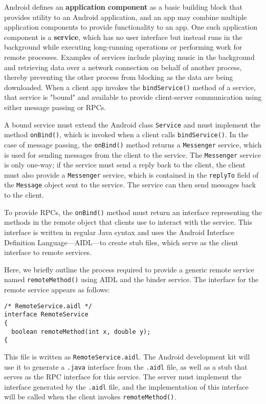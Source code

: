 Android defines an \textbf{application component} as a basic building block that provides utility to an Android application, and an app may combine multiple application components to provide functionality to an app. One such application component is a \textbf{service}, which has no user interface but instead runs in the background while executing long-running operations or performing work for remote processes. Examples of services include playing music in the background and retrieving data over a network connection on behalf of another process, thereby preventing the other process from blocking as the data are being downloaded. When a client app invokes the \texttt{bindService()} method of a service, that service is "bound" and available to provide client-server communication using either message passing or RPCs.

A bound service must extend the Android class \texttt{Service} and must implement the method \texttt{onBind()}, which is invoked when a client calls \texttt{bindService()}. In the case of message passing, the \texttt{onBind()} method returns a \texttt{Messenger} service, which is used for sending messages from the client to the service. The \texttt{Messenger} service is only one-way; if the service must send a reply back to the client, the client must also provide a \texttt{Messenger} service, which is contained in the \texttt{replyTo} field of the \texttt{Message} object sent to the service. The service can then send messages back to the client.

To provide RPCs, the \texttt{onBind()} method must return an interface representing the methods in the remote object that clients use to interact with the service. This interface is written in regular Java syntax and uses the Android Interface Definition Language---AIDL---to create stub files, which serve as the client interface to remote services.

Here, we briefly outline the process required to provide a generic remote service named \texttt{remoteMethod()} using AIDL and the binder service. The interface for the remote service appears as follows:
\begin{verbatim}
/* RemoteService.aidl */
interface RemoteService
{
  boolean remoteMethod(int x, double y);
{
\end{verbatim}
This file is written as \texttt{RemoteService.aidl}. The Android development kit will use it to generate a \texttt{.java} interface from the \texttt{.aidl} file, as well as a stub that serves as the RPC interface for this service. The server must implement the interface generated by the \texttt{.aidl} file, and the implementation of this interface will be called when the client invokes \texttt{remoteMethod()}.

